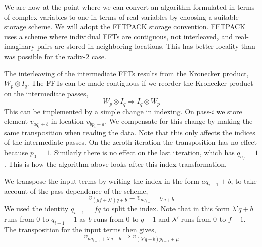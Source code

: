 \documentclass[fleqn,12pt]{article}
\newenvironment{algorithm}{\begin{quote} %
\begin{algorithmic}\samepage}{\end{algorithmic} %
\end{quote}}
\begin{document}
%
We are now at the point where we can convert an algorithm formulated
in terms of complex variables to one in terms of real variables by
choosing a suitable storage scheme.  We will adopt the FFTPACK storage
convention. FFTPACK uses a scheme where individual FFTs are
contiguous, not interleaved, and real-imaginary pairs are stored in
neighboring locations. This has better locality than was possible for
the radix-2 case.

The interleaving of the intermediate FFTs results from the Kronecker
product, $W_p \otimes I_q$. The FFTs can be made contiguous if we
reorder the Kronecker product on the intermediate passes,
%
\begin{equation}
W_p \otimes I_q \Rightarrow I_q \otimes W_p
\end{equation}
%
This can be implemented by a simple change in indexing.  On pass-$i$
we store element $v_{a q_i + b}$ in location $v_{b p_i+a}$. We
compensate for this change by making the same transposition when
reading the data. Note that this only affects the indices of the
intermediate passes.  On the zeroth iteration the transposition has no
effect because $p_0 = 1$. Similarly there is no effect on the last
iteration, which has $q_{n_f} = 1$. This is how the algorithm above
looks after this index transformation,
%
\begin{algorithm}
\ENDFOR
{}
\ENDFOR
\ENDFOR
\ENDFOR
{}
\ENDFOR
\end{algorithm}
%
We transpose the input terms by writing the index in the form $a
q_{i-1} + b$, to take account of the pass-dependence of the scheme,
%
\begin{equation}
v_{(\mu f + \lambda')q + b} = v_{\mu q_{i-1} + \lambda'q + b}
\end{equation}
%
We used the identity $q_{i-1} = f q$ to split the index. Note that in
this form $\lambda'q + b$ runs from 0 to $q_{i-1} - 1$ as $b$ runs
from 0 to $q-1$ and $\lambda'$ runs from 0 to $f-1$. The transposition
for the input terms then gives,
%
\begin{equation}
v_{\mu q_{i-1} + \lambda'q + b} \Rightarrow  v_{(\lambda'q + b) p_{i-1} + \mu}
\end{equation}
\end{document}
